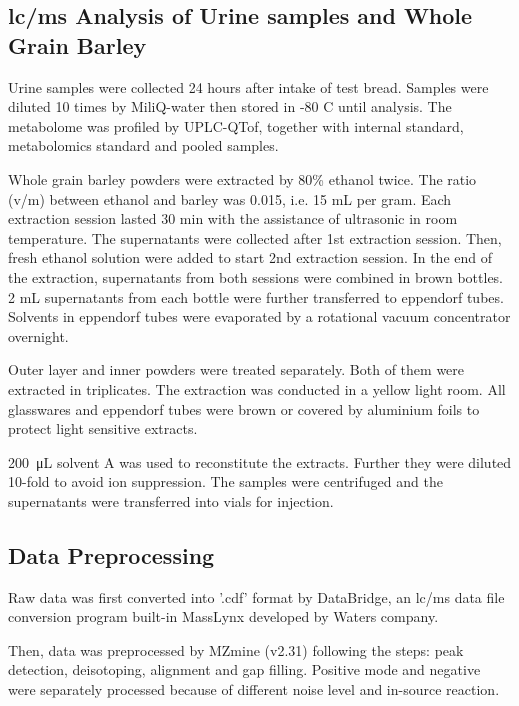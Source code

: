 \subsection{\acrshort{lc/ms} Analysis of Urine samples and Whole Grain Barley}
Urine samples were collected 24 hours after intake of test bread. Samples were diluted 10 times by MiliQ-water then stored in -80 \degree C until analysis. The metabolome was profiled by UPLC-QTof, together with internal standard, metabolomics standard and pooled samples. 

Whole grain barley powders were extracted by 80\% ethanol twice. The ratio (v/m) between ethanol and barley was 0.015, i.e. 15 mL per gram. Each extraction session lasted 30 min with the assistance of ultrasonic in room temperature. The supernatants were collected after 1st extraction session. Then, fresh ethanol solution were added to start 2nd extraction session. In the end of the extraction, supernatants from both sessions were combined in brown bottles. 2 mL supernatants from each bottle were further transferred to eppendorf tubes. Solvents in eppendorf tubes were evaporated by a rotational vacuum concentrator overnight.

Outer layer and inner powders were treated separately. Both of them were extracted in triplicates. The extraction was conducted in a yellow light room. All glasswares and eppendorf tubes were brown or covered by aluminium foils to protect light sensitive extracts.

\SI{200}{\micro\liter} solvent A was used to reconstitute the extracts. Further they were diluted 10-fold to avoid ion suppression. The samples were centrifuged and the supernatants were transferred into vials for injection.

\subsection{Data Preprocessing} 
    Raw data was first converted into '.cdf' format by DataBridge, an \acrshort{lc/ms} data file conversion program built-in MassLynx developed by Waters company.
    
    Then, data was preprocessed by MZmine (v2.31) following the steps: peak detection, deisotoping, alignment and gap filling.
    Positive mode and negative were separately processed because of different noise level and in-source reaction.
    
